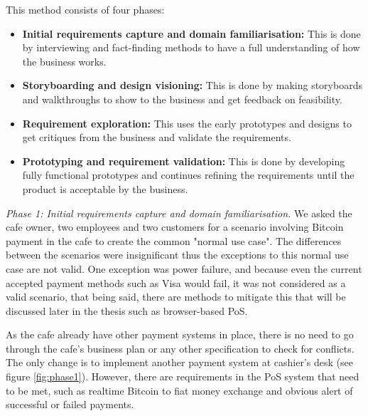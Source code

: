 This method consists of four phases:
\begin{itemize}

\item \textbf{Initial requirements capture and domain familiarisation: } This is done by interviewing and fact-finding methods to have a full understanding of how the business works.

\item \textbf{Storyboarding and design visioning: } This is done by making storyboards and walkthroughs to show to the business and get feedback on feasibility.

\item \textbf{Requirement exploration: } This uses the early prototypes  and designs to get critiques from the business and validate the requirements.

\item \textbf{Prototyping and requirement validation: } This is done by developing fully functional prototypes and continues refining the requirements until the product is acceptable by the business.

\end{itemize}

\textit{Phase 1: Initial requirements capture and domain familiarisation.} We asked the cafe owner, two employees and two customers for a scenario involving Bitcoin payment in the cafe to create the common "normal use case". The differences between the scenarios were insignificant thus the exceptions to this normal use case are not valid. One exception was power failure, and because even the current accepted payment methods such as Visa would fail, it was not considered as a valid scenario, that being said, there are methods to mitigate this that will be discussed later in the thesis such as browser-based PoS.


As the cafe already have other payment systems in place, there is no need to go through the cafe's business plan or any other specification to check for conflicts. The only change is to implement another payment system at cashier's desk (see figure \ref{fig:phase1}).
However, there are requirements in the PoS system that need to be met, such as realtime Bitcoin to fiat money exchange and obvious alert of successful or failed payments.


